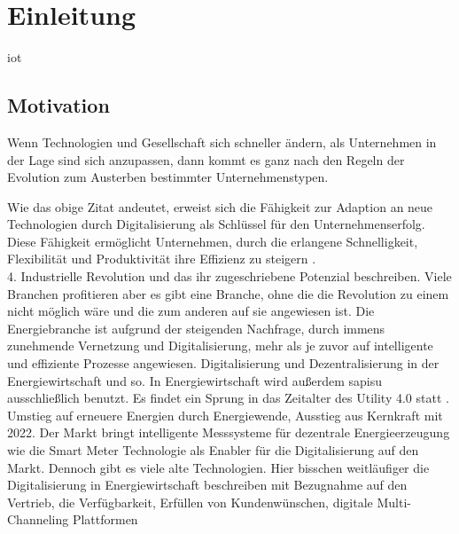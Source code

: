 \section{Einleitung}

\ac{iot}

\subsection{Motivation}

\begin{displayquote}
  \glqq Wenn Technologien und Gesellschaft sich schneller ändern, als Unternehmen in der Lage sind sich anzupassen, dann kommt es ganz nach den Regeln der Evolution zum Austerben bestimmter Unternehmenstypen.\grqq{}
\end{displayquote}

\begin{flushright}
  \citet[S. 3, zitiert nach Land, K.-H. 2015]{Roth2016}
\end{flushright}

Wie das obige Zitat andeutet, erweist sich die Fähigkeit zur Adaption an neue Technologien durch Digitalisierung als Schlüssel für den Unternehmenserfolg. Diese Fähigkeit ermöglicht Unternehmen, durch die erlangene Schnelligkeit, Flexibilität und Produktivität ihre Effizienz zu steigern \citep{Roth2016}.
\\4. Industrielle Revolution und das ihr zugeschriebene Potenzial beschreiben. Viele Branchen profitieren aber es gibt eine Branche,
ohne die die Revolution zu einem nicht möglich wäre und die zum anderen auf sie angewiesen ist.
Die Energiebranche ist aufgrund der steigenden Nachfrage, durch immens zunehmende Vernetzung und Digitalisierung, mehr als je zuvor auf intelligente und effiziente Prozesse angewiesen.
Digitalisierung und Dezentralisierung in der Energiewirtschaft und so. In Energiewirtschaft wird außerdem \ac{sapisu} ausschließlich benutzt.
Es findet ein Sprung in das Zeitalter des \glqq Utility 4.0\grqq{} statt \citep{Doleski2017}.
Umstieg auf erneuere Energien durch Energiewende, Ausstieg aus Kernkraft mit 2022. Der Markt bringt intelligente Messsysteme für dezentrale Energieerzeugung wie die Smart Meter Technologie als Enabler für
die Digitalisierung auf den Markt. Dennoch gibt es viele alte Technologien.
Hier bisschen weitläufiger die Digitalisierung in Energiewirtschaft beschreiben mit Bezugnahme auf den Vertrieb,
die Verfügbarkeit, Erfüllen von Kundenwünschen, digitale Multi-Channeling Plattformen

